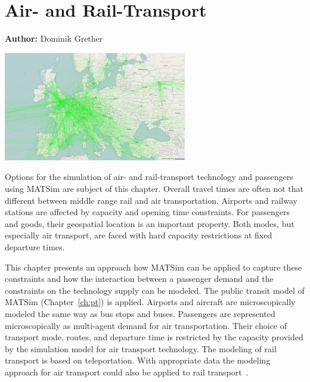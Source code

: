 \chapter{Air- and Rail-Transport}
\label{ch:air}

\hfill \textbf{Author:} Dominik Grether

\begin{center} \includegraphics[width=0.6\textwidth, angle=0]{extending/figures/air/air_network_europe_osm} \end{center}


Options for the simulation of air- and rail-transport technology and passengers using MATSim are subject of this chapter. 
Overall travel times are often not that different between middle range rail and air transportation. 
Airports and railway stations are affected by capacity and opening time constraints. 
For passengers and goods, their geospatial location is an important property. 
Both modes, but especially air transport, are faced with hard capacity restrictions at fixed departure times. 

This chapter presents an approach how MATSim can be applied to capture these constraints and how the interaction between a passenger demand and the constraints on the technology supply can be modeled. 
The public transit model of MATSim (Chapter~\ref{ch:pt}) is applied. %
Airports and aircraft are microscopically modeled the same way as bus stops and buses. 
Passengers are represented microscopically as multi-agent demand for air transportation. 
Their choice of transport mode, routes, and departure time is restricted by the capacity provided by the simulation model for air transport technology. 
The modeling of rail transport is based on teleportation. 
With appropriate data the modeling approach for air transport could also be applied to rail transport~\citep{Quick2012BARailTraffic}.  

